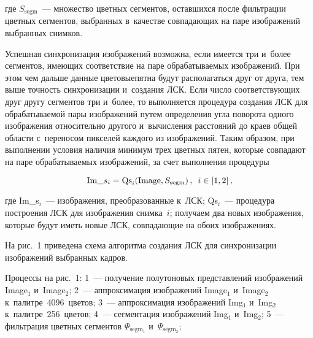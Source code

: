 \begin{multicols}{2}
  \vspace*{-2pt}
  
  \noindent
где $S_{\mathrm{segm}}$~--- множество цветных сегментов, оставшихся после 
фильтрации цветных сегментов, выбранных в~качестве совпадающих на паре 
изображений выбранных снимков.

  Успешная синхронизация изображений возможна, если имеется три 
и~более сегментов, име\-ющих соответствие на паре обрабатываемых 
изоб\-ра\-же\-ний. При этом чем дальше данные цветовые\linebreak пятна будут 
располагаться друг от друга, тем выше точность синхронизации и~создания 
ЛСК. Если число соответствующих друг другу 
сегментов три и~более, то выполняется процедура создания 
ЛСК для обрабатываемой пары изображений путем 
определения угла поворота одного изображения относительно другого 
и~вычисления расстояний до краев общей области с~переносом пикселей 
каждого из изображений. Таким образом, при выполнении условия наличия 
минимум трех цветных пятен, которые совпадают на паре обрабатываемых 
изображений, за счет выполнения процедуры

\vspace*{2pt}

\noindent
  \begin{equation*}
  \mathrm{Im}\_s_i= \mathrm{Qs}_i(\mathrm{Image}, S_{\mathrm{segm}})\,,\enskip i\in [1, 
2]\,,
  \end{equation*}
  
  \vspace*{-2pt}
  
  \noindent
где Im\_s$_i$~--- изображения, преобразованные к~ЛСК;
Qs$_i$~--- процедура построения ЛСК для 
изоб\-ра\-же\-ния снимка~$i$;
получаем два новых изображения, которые будут иметь новые 
ЛСК, совпадающие на обоих изоб\-ра\-же\-ниях.
  
  На рис.~1 приведена схема алгоритма создания 
ЛСК для синхронизации изображений выбранных кадров.



  Процессы на рис.~1:
{1}~--- получение полутоновых представлений изоб\-ра\-же\-ний
Image$_1$ и~Image$_2$;
  {2}~--- аппроксимация изоб\-ра\-же\-ний Image$_1$ и~Image$_2$
  к~палитре~4096~цветов;
  {3}~--- аппроксимация изобра\-же\-ний Img$_1$ и~Img$_2$ 
к~палитре~256~цветов;
  {4}~---  сегментация изоб\-ра\-же\-ний Img$_1$ и~Img$_2$;
  {5}~--- фильт\-ра\-ция цветных сегментов $\Psi_\mathrm{segm_1}$ 
и~$\Psi_\mathrm{segm_2}$;\linebreak\vspace*{-12pt} 

  
  \pagebreak
  
  \end{multicols}
  
